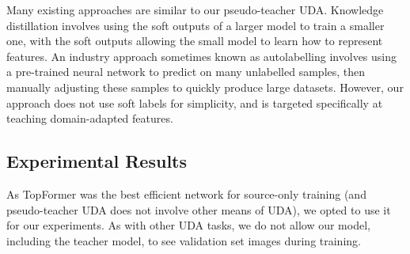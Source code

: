 \documentclass[a4paper,12pt]{report}
\begin{document}
Many existing approaches are similar to our pseudo-teacher UDA. Knowledge distillation involves using the soft outputs of a larger model to train a smaller one, with the soft outputs allowing the small model to learn how to represent features. An industry approach sometimes known as autolabelling involves using a pre-trained neural network to predict on many unlabelled samples, then manually adjusting these samples to quickly produce large datasets. However, our approach does not use soft labels for simplicity, and is targeted specifically at teaching domain-adapted features.

\subsection{Experimental Results}
As TopFormer was the best efficient network for source-only training (and pseudo-teacher UDA does not involve other means of UDA), we opted to use it for our experiments. As with other UDA tasks, we do not allow our model, including the teacher model, to see validation set images during training.

\begin{table}[]
    \caption{Results of Pseudo-Teacher UDA on GTA \textrightarrow CS}
\end{table}
\end{document}
